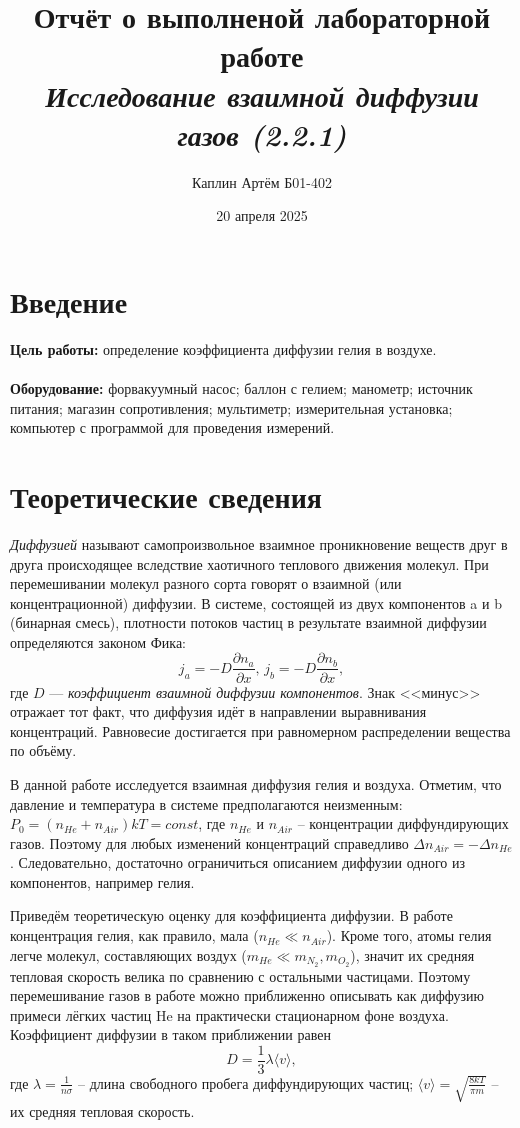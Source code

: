 \documentclass[a4paper,12pt]{article}
\title{\textbf{Отчёт о выполненой лабораторной работе \\ \textit{Исследование взаимной диффузии газов (2.2.1)}}}
\author{Каплин Артём Б01-402}
\date{20 апреля 2025}
\begin{document}
\maketitle
	
	\section{Введение}
	
	\textbf{Цель работы:} определение коэффициента диффузии гелия в воздухе.\\
    \\
    \textbf{Оборудование:} форвакуумный насос; баллон с гелием; манометр; источник питания; магазин сопротивления; мультиметр; измерительная установка; компьютер с программой для проведения измерений.
	
	\section{Теоретические сведения }

    \textit{Диффузией}  называют самопроизвольное взаимное проникновение веществ друг в друга происходящее вследствие хаотичного теплового движения молекул. При перемешивании молекул разного сорта говорят о взаимной (или концентрационной) диффузии. В системе, состоящей из двух компонентов a и b (бинарная смесь), плотности потоков частиц в результате взаимной диффузии определяются законом Фика:
        \begin{equation}
            j_a = -D \frac{\partial n_a}{\partial x}, \, j_b = -D \frac{\partial n_b}{\partial x},
        \end{equation}
        где $D$ — \textit{коэффициент взаимной диффузии компонентов}. Знак <<минус>> отражает тот факт, что диффузия идёт в направлении выравнивания концентраций. Равновесие достигается при равномерном распределении вещества по объёму.

        В данной работе исследуется взаимная диффузия гелия и воздуха. Отметим, что давление и температура в системе предполагаются неизменным: $P_0 = (n_{He}+n_{Air})kT = const$, где $n_{He}$  и $n_{Air}$ -- концентрации диффундирующих газов. Поэтому для любых изменений концентраций справедливо $\Delta n_{Air} = -\Delta n_{He}$. Следовательно, достаточно ограничиться описанием диффузии одного из компонентов, например гелия.

        Приведём теоретическую оценку для коэффициента диффузии. В работе концентрация гелия, как правило, мала ($n_{He} \ll n_{Air}$). Кроме того, атомы гелия легче молекул, составляющих воздух ($m_{He} \ll m_{N_2}, m_{O_2}$), значит их средняя тепловая скорость велика по сравнению с остальными частицами. Поэтому перемешивание газов в работе можно приближенно описывать как диффузию примеси лёгких частиц He на практически стационарном фоне воздуха. Коэффициент диффузии в таком приближении равен
        \begin{equation}
            \label{D}
            D = \frac{1}{3} \lambda \langle v \rangle,
        \end{equation}
        где $\lambda = \frac{1}{n\sigma}$ -- длина свободного пробега диффундирующих частиц; $\langle v \rangle = \sqrt{\frac{8kT}{\pi m}}$ -- их средняя тепловая скорость.
\end{document}
